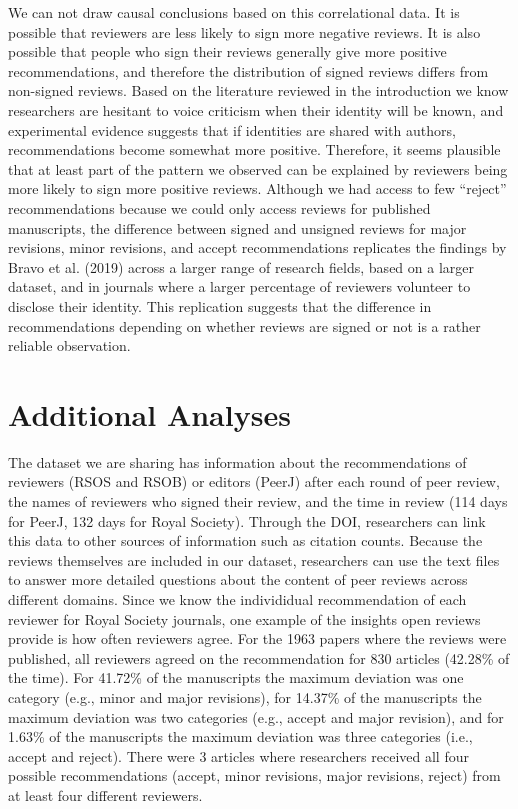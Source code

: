 \documentclass[,jou, a4paper,floatsintext]{apa6}
\begin{document}
We can not draw causal conclusions based on this correlational data. It is possible that reviewers are less likely to sign more negative reviews. It is also possible that people who sign their reviews generally give more positive recommendations, and therefore the distribution of signed reviews differs from non-signed reviews. Based on the literature reviewed in the introduction we know researchers are hesitant to voice criticism when their identity will be known, and experimental evidence suggests that if identities are shared with authors, recommendations become somewhat more positive. Therefore, it seems plausible that at least part of the pattern we observed can be explained by reviewers being more likely to sign more positive reviews. Although we had access to few \enquote{reject} recommendations because we could only access reviews for published manuscripts, the difference between signed and unsigned reviews for major revisions, minor revisions, and accept recommendations replicates the findings by Bravo et al. (2019) across a larger range of research fields, based on a larger dataset, and in journals where a larger percentage of reviewers volunteer to disclose their identity. This replication suggests that the difference in recommendations depending on whether reviews are signed or not is a rather reliable observation.

\hypertarget{additional-analyses}{%
\section{Additional Analyses}\label{additional-analyses}}

The dataset we are sharing has information about the recommendations of reviewers (RSOS and RSOB) or editors (PeerJ) after each round of peer review, the names of reviewers who signed their review, and the time in review (114 days for PeerJ, 132 days for Royal Society). Through the DOI, researchers can link this data to other sources of information such as citation counts. Because the reviews themselves are included in our dataset, researchers can use the text files to answer more detailed questions about the content of peer reviews across different domains. Since we know the individidual recommendation of each reviewer for Royal Society journals, one example of the insights open reviews provide is how often reviewers agree. For the 1963 papers where the reviews were published, all reviewers agreed on the recommendation for 830 articles (42.28\% of the time). For 41.72\% of the manuscripts the maximum deviation was one category (e.g., minor and major revisions), for 14.37\% of the manuscripts the maximum deviation was two categories (e.g., accept and major revision), and for 1.63\% of the manuscripts the maximum deviation was three categories (i.e., accept and reject). There were 3 articles where researchers received all four possible recommendations (accept, minor revisions, major revisions, reject) from at least four different reviewers.
\end{document}
